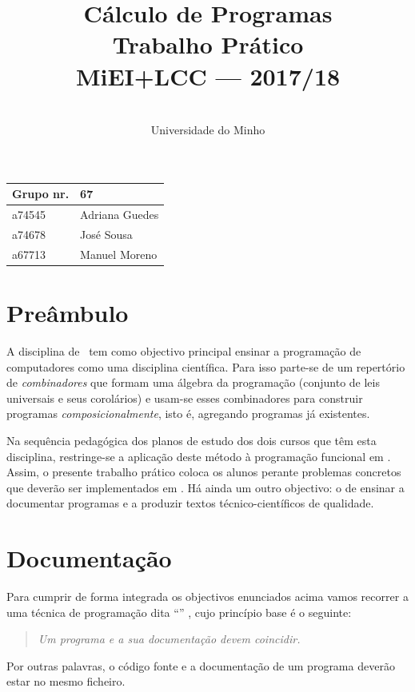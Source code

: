 \documentclass[a4paper]{article}
\title{
       	    Cálculo de Programas
\\
       	Trabalho Prático
\\
       	MiEI+LCC --- 2017/18
}
\author{
       	\dium
\\
       	Universidade do Minho
}
\date\mydate
\begin{document}
\maketitle

\begin{center}\large
\begin{tabular}{ll}
\textbf{Grupo} nr. & 67 
\\\hline
a74545 & Adriana Guedes	
\\
a74678 & José Sousa	
\\
a67713 & Manuel Moreno	
\end{tabular}
\end{center}

\section{Preâmbulo}

A disciplina de \CP\ tem como objectivo principal ensinar
a progra\-mação de computadores como uma disciplina científica. Para isso
parte-se de um repertório de \emph{combinadores} que formam uma álgebra da
programação (conjunto de leis universais e seus corolários) e usam-se esses
combinadores para construir programas \emph{composicionalmente}, isto é,
agregando programas já existentes.
  
Na sequência pedagógica dos planos de estudo dos dois cursos que têm esta
disciplina, restringe-se a aplicação deste método à programação funcional
em \Haskell. Assim, 
o presente trabalho prático coloca os alunos perante problemas
concretos que deverão ser implementados em \Haskell.
Há ainda um outro objectivo: o de ensinar a documentar programas e
a produzir textos técnico-científicos de qualidade.

\section{Documentação}
Para cumprir de forma integrada os objectivos enunciados acima vamos recorrer
a uma técnica de programa\-ção dita ``'' \cite{Kn92}, cujo
princípio base é o seguinte:
\begin{quote}\em
Um programa e a sua documentação devem coincidir.
\end{quote}
Por outras palavras, o código fonte e a documentação de um programa deverão estar no
mesmo ficheiro.
\end{document}
